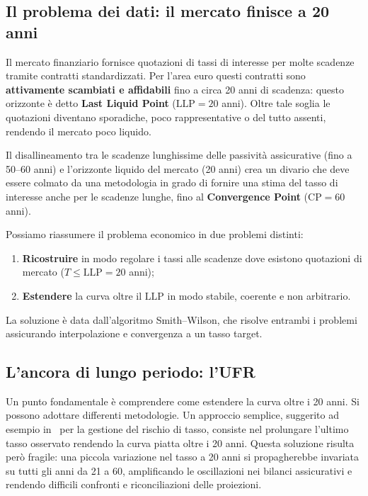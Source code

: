 \documentclass[11pt,a4paper]{article}
\theoremstyle{plain}
\theoremstyle{definition}
\theoremstyle{remark}
\newcommand{\LLP}{\ensuremath{\mathrm{LLP}}}
\newcommand{\CP}{\ensuremath{\mathrm{CP}}}
\begin{document}
\subsection{Il problema dei dati: il mercato finisce a 20 anni}

Il mercato finanziario fornisce quotazioni di tassi di interesse per molte scadenze tramite
contratti standardizzati. Per l'area euro questi contratti sono \textbf{attivamente scambiati e
affidabili} fino a circa 20 anni di scadenza: questo orizzonte \`e detto
\textbf{Last Liquid Point} ($\LLP = 20$ anni). Oltre tale soglia le quotazioni diventano
sporadiche, poco rappresentative o del tutto assenti, rendendo il mercato poco liquido.

Il disallineamento tra le scadenze lunghissime delle passivit\`a assicurative (fino a 50--60 anni)
e l'orizzonte liquido del mercato (20 anni) crea un divario che deve essere colmato da una
metodologia in grado di fornire una stima del tasso di interesse anche per le scadenze lunghe,
fino al \textbf{Convergence Point} ($\CP = 60$ anni).


Possiamo riassumere il problema economico in due problemi distinti:
\begin{enumerate}
  \item \textbf{Ricostruire} in modo regolare i tassi alle scadenze dove esistono
        quotazioni di mercato ($T \le \LLP = 20$ anni);
  \item \textbf{Estendere} la curva oltre il $\LLP$ in modo
        stabile, coerente e non arbitrario.
\end{enumerate}

La soluzione è data dall'algoritmo Smith--Wilson, che risolve entrambi i problemi assicurando interpolazione e convergenza a un tasso target.

\subsection{L'ancora di lungo periodo: l'UFR}

Un punto fondamentale \`e comprendere come estendere la curva oltre i 20 anni. Si possono
adottare differenti metodologie. Un approccio semplice, suggerito ad esempio
in~\cite{hull2018} per la gestione del rischio di tasso, consiste nel prolungare l'ultimo
tasso osservato rendendo la curva piatta oltre i 20 anni. Questa soluzione risulta per\`o
fragile: una piccola variazione nel tasso a 20 anni si propagherebbe invariata su tutti
gli anni da 21 a 60, amplificando le oscillazioni nei bilanci assicurativi e rendendo
difficili confronti e riconciliazioni delle proiezioni.
\end{document}
